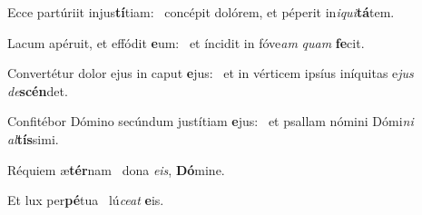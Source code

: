 \item Ecce partúriit injus\textbf{tí}tiam:~\psstar{} concépit dolórem, et péperit in\textit{i}\textit{qui}\textbf{tá}tem.

\item Lacum apéruit, et effódit \textbf{e}um:~\psstar{} et íncidit in fóve\textit{am} \textit{quam} \textbf{fe}cit.

\item Convertétur dolor ejus in caput \textbf{e}jus:~\psstar{} et in vérticem ipsíus iníquitas e\textit{jus} \textit{de}\textbf{scén}det.

\item Confitébor Dómino secúndum justítiam \textbf{e}jus:~\psstar{} et psallam nómini Dómi\textit{ni} \textit{al}\textbf{tís}simi.

\item Réquiem æ\textbf{tér}nam~\psstar{} dona \textit{e}\textit{is}, \textbf{Dó}mine.

\item Et lux per\textbf{pé}tua~\psstar{} lú\textit{ce}\textit{at} \textbf{e}is.